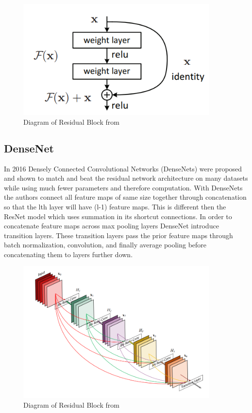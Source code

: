 \begin{figure}[ht]
\includegraphics[width=0.9\textwidth]{Figures/ResBlock.png}
\caption{Diagram of Residual Block from \cite{ResNet}}
\label{fig:ResBlock}
\end{figure}

\subsection{DenseNet}

In 2016 Densely Connected Convolutional Networks (DenseNets) were proposed and shown to match and beat the residual network architecture on many datasets while using much fewer parameters and therefore computation. With DenseNets the authors connect all feature maps of same size together through concatenation so that the lth layer will have (l-1) feature maps. This is different then the ResNet model which uses summation in its shortcut connections. In order to concatenate feature maps across max pooling layers DenseNet introduce transition layers. These transition layers pass the prior feature maps through batch normalization, convolution, and finally average pooling before concatenating them to layers further down.

\begin{figure}[ht]
\includegraphics[width=0.9\textwidth]{Figures/DenseNet.png}
\caption{Diagram of Residual Block from \cite{DenseNet}}
\label{fig:DenseNet}
\end{figure}

